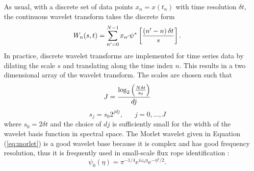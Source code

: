 As usual, with a discrete set of data points $x_n=x(t_n)$ with time resolution $\delta t$, the continuous wavelet transform takes the discrete form
\begin{equation}
    W_n(s,t) = \sum_{n'=0}^{N-1}x_{n'}\psi^*\left[ \frac{\left( n'-n \right)\delta t}{s} \right].
    \label{eq:wavetrans2}
\end{equation}
In practice, discrete wavelet transforms are implemented for time series data by dilating the scale $s$ and translating along the time index $n$. This results in a two dimensional array of the wavelet transform. The scales are chosen such that
\begin{equation}
    J = \frac{\log_2\left( \frac{N \delta t}{s_0} \right)}{dj}
\end{equation}
\begin{equation}
    s_j = s_0 2^{j dj},\hspace{20pt} j = 0,...,J
    \label{eq:scales}
\end{equation}
where $s_0 = 2\delta t$ and the choice of $dj$ is sufficiently small for the width of the wavelet basis function in spectral space. The Morlet wavelet given in Equation (\ref{eq:morlet}) is a good wavelet base because it is complex and has good frequency resolution, thus it is frequently used in small-scale flux rope identification \citep{Telloni:2012, Telloni:2013, Zhao:2020, Farge:1992}:
\begin{equation}
    \psi_0(\eta) = \pi^{-1/4}e^{i\omega_0\eta}e^{-\eta^2/2}.
    \label{eq:morlet}
\end{equation}

